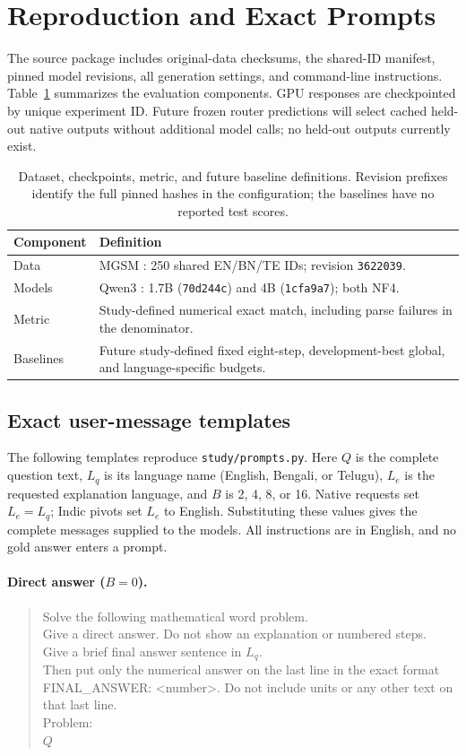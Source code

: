 \documentclass[11pt]{article}
\begin{document}
\appendix
\section{Reproduction and Exact Prompts}
The source package includes original-data checksums, the shared-ID manifest, pinned model revisions, all generation settings, and command-line instructions. Table~\ref{tab:setup} summarizes the evaluation components. GPU responses are checkpointed by unique experiment ID. Future frozen router predictions will select cached held-out native outputs without additional model calls; no held-out outputs currently exist.

\begin{table}[t]
\centering
\begin{tabular}{p{1.9cm}p{4.6cm}}
\toprule
Component & Definition \\
\midrule
Data & MGSM \citep{shi2023mgsm}: 250 shared EN/BN/TE IDs; revision \texttt{3622039}. \\
Models & Qwen3 \citep{qwen2025}: 1.7B (\texttt{70d244c}) and 4B (\texttt{1cfa9a7}); both NF4. \\
Metric & Study-defined numerical exact match, including parse failures in the denominator. \\
Baselines & Future study-defined fixed eight-step, development-best global, and language-specific budgets. \\
\bottomrule
\end{tabular}
\caption{Dataset, checkpoints, metric, and future baseline definitions. Revision prefixes identify the full pinned hashes in the configuration; the baselines have no reported test scores.}
\label{tab:setup}
\end{table}

\subsection{Exact user-message templates}
The following templates reproduce \texttt{study/prompts.py}. Here $Q$ is the complete question text, $L_q$ is its language name (English, Bengali, or Telugu), $L_e$ is the requested explanation language, and $B$ is 2, 4, 8, or 16. Native requests set $L_e=L_q$; Indic pivots set $L_e$ to English. Substituting these values gives the complete messages supplied to the models. All instructions are in English, and no gold answer enters a prompt.

\paragraph{Direct answer ($B=0$).}
\begin{quote}\small\ttfamily
Solve the following mathematical word problem.\\
Give a direct answer. Do not show an explanation or numbered steps.\\
Give a brief final answer sentence in $L_q$.\\
Then put only the numerical answer on the last line in the exact format FINAL\_ANSWER: <number>. Do not include units or any other text on that last line.\\[0.5em]
Problem:\\
$Q$
\end{quote}
\end{document}
